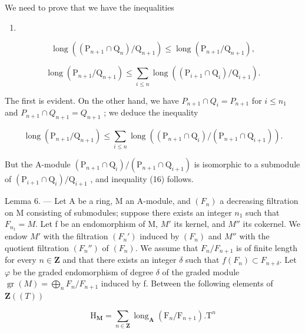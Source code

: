 We need to prove that we have the inequalities

\begin{enumerate}
\def\labelenumi{(\arabic{enumi})}
\setcounter{enumi}{14}
\tightlist
\item
\end{enumerate}

\[
\operatorname{long} \left(\left(\mathrm{P} _ {n + 1} \cap \mathrm{Q} _ {n}\right) / \mathrm{Q} _ {n + 1}\right) \leqslant \operatorname{long} \left(\mathrm{P} _ {n + 1} / \mathrm{Q} _ {n + 1}\right),\tag{16}
\]

\[
\operatorname{long} \left(\mathrm{P} _ {n + 1} / \mathrm{Q} _ {n + 1}\right) \leqslant \sum_ {i \leqslant n} \operatorname{long} \left(\left(\mathrm{P} _ {i + 1} \cap \mathrm{Q} _ {i}\right) / \mathrm{Q} _ {i + 1}\right).
\]

The first is evident. On the other hand, we have \(P_{n+1} \cap Q_i = P_{n+1}\) for \(i \leqslant n_1\) and \(P_{n+1} \cap Q_{n+1} = Q_{n+1}\) ; we deduce the inequality

\[
\operatorname{long} \left(\mathrm{P} _ {n + 1} / \mathrm{Q} _ {n + 1}\right) \leqslant \sum_ {i \leqslant n} \operatorname{long} \left(\left(\mathrm{P} _ {n + 1} \cap \mathrm{Q} _ {i}\right) / \left(\mathrm{P} _ {n + 1} \cap \mathrm{Q} _ {i + 1}\right)\right).
\]

But the A-module \((\mathrm{P}_{n+1} \cap \mathrm{Q}_i)/(\mathrm{P}_{n+1} \cap \mathrm{Q}_{i+1})\) is isomorphic to a submodule of \((\mathrm{P}_{i+1} \cap \mathrm{Q}_i)/\mathrm{Q}_{i+1}\) , and inequality (16) follows.

Lemma 6. --- Let A be a ring, M an A-module, and \((F_{n})\) a decreasing filtration on M consisting of submodules; suppose there exists an integer \(n_{1}\) such that \(F_{n_{1}} = M\). Let f be an endomorphism of M, \(M'\) its kernel, and \(M''\) its cokernel. We endow \(M'\) with the filtration \((F_{n}')\) induced by \((F_{n})\) and \(M''\) with the quotient filtration \((F_{n}'')\) of \((F_{n})\). We assume that \(F_{n}/F_{n+1}\) is of finite length for every \(n \in \mathbf{Z}\) and that there exists an integer \(\delta\) such that \(f(F_{n}) \subset F_{n+\delta}\). Let \(\varphi\) be the graded endomorphism of degree \(\delta\) of the graded module \(\operatorname{gr}(M) = \bigoplus_{n} F_{n}/F_{n+1}\) induced by f. Between the following elements of \(\mathbf{Z}((T))\)

\[
\mathrm{H} _ {\mathbf {M}} = \sum_ {n \in \mathbf {Z}} \operatorname{long} _ {\mathbf {A}} (\mathrm{F} _ {n} / \mathrm{F} _ {n + 1}). \mathrm{T} ^ {n}
\]

